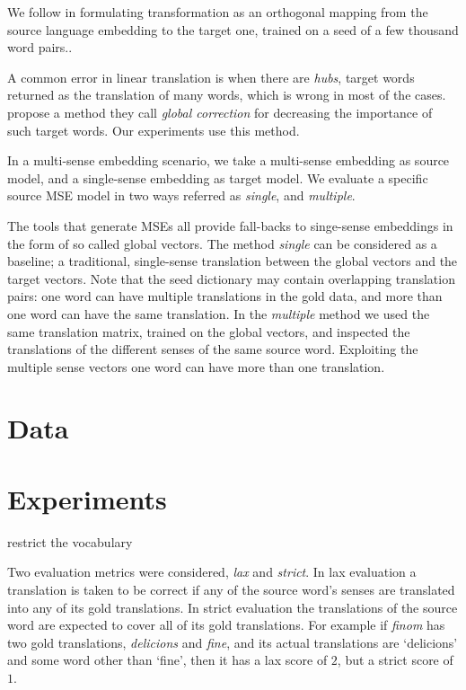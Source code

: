 \documentclass[11pt]{article}
\begin{document}
We follow \cite{Xing:2015} in formulating transformation as an orthogonal
mapping from the source language embedding to the target one, trained on a seed
of a few thousand word pairs..

A common error in linear translation is when there are \emph{hubs}, target
words returned as the translation of many words, which is wrong in most of the
cases.  \cite{Dinu:2015} propose a method they call \emph{global correction}
for decreasing the importance of such target words. Our experiments use this
method.

In a multi-sense embedding scenario, we take a multi-sense embedding
as source model, and a single-sense embedding as target model.
We evaluate a specific source MSE model in two ways 
referred as \emph{single}, and \emph{multiple}.

The tools that generate MSEs all provide fall-backs to singe-sense embeddings
in the form of so called global vectors. The method \emph{single} can be
considered as a baseline; a traditional, single-sense translation between the
global vectors and the target vectors.  Note that the seed dictionary may
contain overlapping translation pairs: one word can have multiple translations
in the gold data, and more than one word can have the same translation.  In
the \emph{multiple} method we used the same translation matrix, trained on the
global vectors, and inspected the translations of the different senses of the
same source word.  Exploiting the multiple sense vectors one word can have
more than one translation.

\section{Data}

\section{Experiments}

restrict the vocabulary

Two evaluation metrics were considered, \emph{lax} and \emph{strict}. In lax
evaluation a translation is taken to be correct if any of the source word's
senses are translated into any of its gold translations.  In strict evaluation
the translations of the source word are expected to cover all of its gold
translations.  For example if {\it finom} has two gold translations, {\it
  delicions} and {\it fine}, and its actual translations are `delicions' and some
word other than `fine', then it has a lax score of $2$, but a strict score
of $1$.
\end{document}
